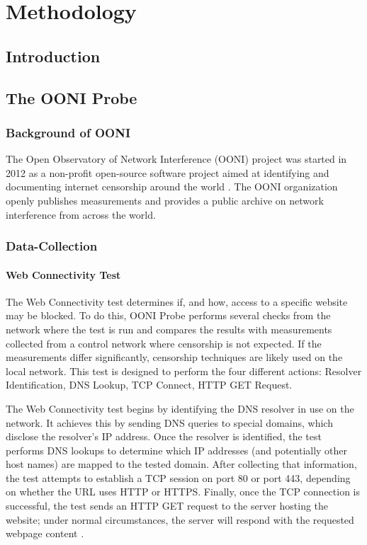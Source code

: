 \chapter{Methodology}
\section{Introduction}



\section{The OONI Probe}

\subsection{Background of OONI}

The Open Observatory of Network Interference (OONI) project was started in 2012 as a non-profit open-source software project aimed at identifying and documenting internet censorship around the world \cite{ooniAbout}. The OONI organization openly publishes measurements and provides a public archive on network interference from across the world. 

\subsection{Data-Collection}

\subsubsection{Web Connectivity Test}

The Web Connectivity test determines if, and how, access to a specific website may be blocked. To do this, OONI Probe performs several checks from the network where the test is run and compares the results with measurements collected from a control network where censorship is not expected. If the measurements differ significantly, censorship techniques are likely used on the local network. This test is designed to perform the four different actions: Resolver Identification, DNS Lookup, TCP Connect, HTTP GET Request.

The Web Connectivity test begins by identifying the DNS resolver in use on the network. It achieves this by sending DNS queries to special domains, which disclose the resolver’s IP address. Once the resolver is identified, the test performs DNS lookups to determine which IP addresses (and potentially other host names) are mapped to the tested domain. After collecting that information, the test attempts to establish a TCP session on port 80 or port 443, depending on whether the URL uses HTTP or HTTPS. Finally, once the TCP connection is successful, the test sends an HTTP GET request to the server hosting the website; under normal circumstances, the server will respond with the requested webpage content \cite{ooniConnectivityTest}.

